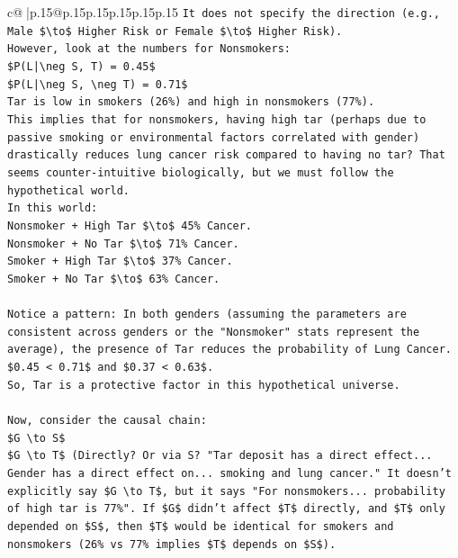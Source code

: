 \documentclass{article}
\begin{document}
{\begin{supertabular}{c@{$\;$}|p{.15\linewidth}@{}p{.15\linewidth}p{.15\linewidth}p{.15\linewidth}p{.15\linewidth}p{.15\linewidth}}
{{{\texttt{It does not specify the direction (e.g., Male \$\textbackslash{}to\$ Higher Risk or Female \$\textbackslash{}to\$ Higher Risk).} \\
\texttt{However, look at the numbers for Nonsmokers:} \\
\texttt{\$P(L|\textbackslash{}neg S, T) = 0.45\$} \\
\texttt{\$P(L|\textbackslash{}neg S, \textbackslash{}neg T) = 0.71\$} \\
\texttt{Tar is low in smokers (26\%) and high in nonsmokers (77\%).} \\
\texttt{This implies that for nonsmokers, having high tar (perhaps due to passive smoking or environmental factors correlated with gender) drastically reduces lung cancer risk compared to having no tar? That seems counter{-}intuitive biologically, but we must follow the hypothetical world.} \\
\texttt{In this world:} \\
\texttt{Nonsmoker + High Tar \$\textbackslash{}to\$ 45\% Cancer.} \\
\texttt{Nonsmoker + No Tar \$\textbackslash{}to\$ 71\% Cancer.} \\
\texttt{Smoker + High Tar \$\textbackslash{}to\$ 37\% Cancer.} \\
\texttt{Smoker + No Tar \$\textbackslash{}to\$ 63\% Cancer.} \\
\\ 
\texttt{Notice a pattern: In both genders (assuming the parameters are consistent across genders or the "Nonsmoker" stats represent the average), the presence of Tar reduces the probability of Lung Cancer.} \\
\texttt{\$0.45 < 0.71\$ and \$0.37 < 0.63\$.} \\
\texttt{So, Tar is a protective factor in this hypothetical universe.} \\
\\ 
\texttt{Now, consider the causal chain:} \\
\texttt{\$G \textbackslash{}to S\$} \\
\texttt{\$G \textbackslash{}to T\$ (Directly? Or via S? "Tar deposit has a direct effect... Gender has a direct effect on... smoking and lung cancer." It doesn't explicitly say \$G \textbackslash{}to T\$, but it says "For nonsmokers... probability of high tar is 77\%". If \$G\$ didn't affect \$T\$ directly, and \$T\$ only depended on \$S\$, then \$T\$ would be identical for smokers and nonsmokers (26\% vs 77\% implies \$T\$ depends on \$S\$).} \\
}}}
\end{supertabular}}
\end{document}
